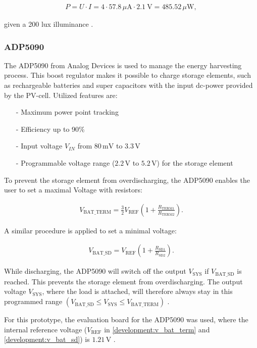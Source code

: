 \begin{align}
	P = U\cdot I = 4\cdot 57.8\,\mu\text{A}\cdot 2.1\ \text{V}=485.52\,\mu \text{W},\label{development:cell_power}
\end{align}

given a 200 lux illuminance \cite{amorton}.

\subsubsection{ADP5090}
The ADP5090 from Analog Devices is used to manage the energy harvesting process.
This boost regulator makes it possible to charge storage elements, such as rechargeable batteries and super capacitors with the input dc-power provided by the PV-cell. Utilized features are:
\begin{itemize}
	\item[-] Maximum power point tracking
	\item[-] Efficiency up to 90\%
	\item[-] Input voltage $V_{IN}$ from $80\,\text{mV}$ to $3.3\,\text{V}$
	\item[-] Programmable voltage range ($2.2\,\text{V}$ to $5.2\,\text{V}$) for the storage element
\end{itemize}
To prevent the storage element from overdischarging, the ADP5090 enables the user to set a maximal Voltage with resistors:

\begin{align}
	V_{\text{BAT\_TERM}} = \frac{3}{2} V_{\text{REF}}\left(1+\frac{R_{\text{TERM1}}}{R_{\text{TERM2}}} \right).\label{development:v_bat_term} 
\end{align} 

A similar procedure is applied to set a minimal voltage:

\begin{align}
	V_{\text{BAT\_SD}}=V_{\text{REF}} \left(1+\frac{R_{\text{SD1}}}{R_{\text{SD2}}} \right).\label{development:v_bat_sd} 
\end{align}  

While discharging, the ADP5090 will switch off the output $V_{\text{SYS}}$ if $V_{\text{BAT\_SD}}$ is reached. This prevents the storage element from overdischarging.
The output voltage $V_{\text{SYS}}$, where the load is attached, will therefore always stay in this programmed range $(V_{\text{BAT\_SD}}\le V_{\text{SYS}}\le V_{\text{BAT\_TERM}})$ \cite{adp}.

For this prototype, the evaluation board for the ADP5090 was used, where the internal reference voltage ($V_{\text{REF}}$ in \eqref{development:v_bat_term} and \eqref{development:v_bat_sd}) is $1.21\,\text{V}$ \cite{adp_eval}.

